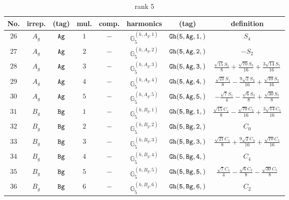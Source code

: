 \documentclass[fleqn,8pt]{jsarticle}
\begin{document}
\begin{table}[ht!]
\begin{center}
\caption{rank 5}
\renewcommand{\arraystretch}{1.3}
\begin{tabular}{cccccccc} \hline \hline
No. & irrep. & (tag) & mul. & comp. & harmonics & (tag) & definition \\ \hline
$ 26 $ & $ A_{g} $ & $ {\tt Ag} $ & $ 1 $ & $ - $ & $ \mathbb{G}_{5}^{(h,A_{g},1)} $ & $ {\tt Gh(5,Ag,1,)} $ & $ S_{4} $ \\
$ 27 $ & $ A_{g} $ & $ {\tt Ag} $ & $ 2 $ & $ - $ & $ \mathbb{G}_{5}^{(h,A_{g},2)} $ & $ {\tt Gh(5,Ag,2,)} $ & $ - S_{2} $ \\
$ 28 $ & $ A_{g} $ & $ {\tt Ag} $ & $ 3 $ & $ - $ & $ \mathbb{G}_{5}^{(h,A_{g},3)} $ & $ {\tt Gh(5,Ag,3,)} $ & $ \frac{\sqrt{15} S_{1}}{8} + \frac{\sqrt{70} S_{3}}{16} + \frac{3 \sqrt{14} S_{5}}{16} $ \\
$ 29 $ & $ A_{g} $ & $ {\tt Ag} $ & $ 4 $ & $ - $ & $ \mathbb{G}_{5}^{(h,A_{g},4)} $ & $ {\tt Gh(5,Ag,4,)} $ & $ \frac{\sqrt{21} S_{1}}{8} - \frac{9 \sqrt{2} S_{3}}{16} + \frac{\sqrt{10} S_{5}}{16} $ \\
$ 30 $ & $ A_{g} $ & $ {\tt Ag} $ & $ 5 $ & $ - $ & $ \mathbb{G}_{5}^{(h,A_{g},5)} $ & $ {\tt Gh(5,Ag,5,)} $ & $ - \frac{\sqrt{7} S_{1}}{4} - \frac{\sqrt{6} S_{3}}{8} + \frac{\sqrt{30} S_{5}}{8} $ \\
$ 31 $ & $ B_{g} $ & $ {\tt Bg} $ & $ 1 $ & $ - $ & $ \mathbb{G}_{5}^{(h,B_{g},1)} $ & $ {\tt Gh(5,Bg,1,)} $ & $ \frac{\sqrt{15} C_{1}}{8} - \frac{\sqrt{70} C_{3}}{16} + \frac{3 \sqrt{14} C_{5}}{16} $ \\
$ 32 $ & $ B_{g} $ & $ {\tt Bg} $ & $ 2 $ & $ - $ & $ \mathbb{G}_{5}^{(h,B_{g},2)} $ & $ {\tt Gh(5,Bg,2,)} $ & $ C_{0} $ \\
$ 33 $ & $ B_{g} $ & $ {\tt Bg} $ & $ 3 $ & $ - $ & $ \mathbb{G}_{5}^{(h,B_{g},3)} $ & $ {\tt Gh(5,Bg,3,)} $ & $ \frac{\sqrt{21} C_{1}}{8} + \frac{9 \sqrt{2} C_{3}}{16} + \frac{\sqrt{10} C_{5}}{16} $ \\
$ 34 $ & $ B_{g} $ & $ {\tt Bg} $ & $ 4 $ & $ - $ & $ \mathbb{G}_{5}^{(h,B_{g},4)} $ & $ {\tt Gh(5,Bg,4,)} $ & $ C_{4} $ \\
$ 35 $ & $ B_{g} $ & $ {\tt Bg} $ & $ 5 $ & $ - $ & $ \mathbb{G}_{5}^{(h,B_{g},5)} $ & $ {\tt Gh(5,Bg,5,)} $ & $ \frac{\sqrt{7} C_{1}}{4} - \frac{\sqrt{6} C_{3}}{8} - \frac{\sqrt{30} C_{5}}{8} $ \\
$ 36 $ & $ B_{g} $ & $ {\tt Bg} $ & $ 6 $ & $ - $ & $ \mathbb{G}_{5}^{(h,B_{g},6)} $ & $ {\tt Gh(5,Bg,6,)} $ & $ C_{2} $ \\
 \hline \hline
\end{tabular}
\end{center}
\end{table}
\end{document}

